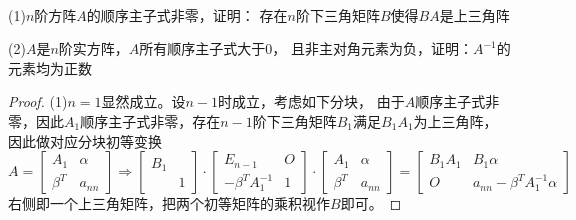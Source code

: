 ~

\begin{exercise}[分块矩阵与数学归纳法]
  (1)$n$阶方阵$A$的顺序主子式非零，证明：
  存在$n$阶下三角矩阵$B$使得$BA$是上三角阵

  (2)$A$是$n$阶实方阵，$A$所有顺序主子式大于$0$，
  且非主对角元素为负，证明：$A^{-1}$的元素均为正数
\end{exercise}

\begin{proof}
  (1)$n=1$显然成立。设$n-1$时成立，考虑如下分块，
  由于$A$顺序主子式非零，因此$A_1$顺序主子式非零，存在$n-1$阶下三角矩阵$B_1$满足$B_1A_1$为上三角阵，
  因此做对应分块初等变换
  \begin{equation*}
    A = \left[
      \begin{array}{cc}
        A_1&\alpha \\
        \beta^T&a_{nn}
      \end{array}
    \right] \Rightarrow \left[
      \begin{array}{cc}
        B_1& \\
           &1
      \end{array}
    \right] \cdot \left[
      \begin{array}{cc}
        E_{n-1}&O\\
        -\beta^T A_1^{-1}&1
      \end{array}
    \right] \cdot \left[
      \begin{array}{cc}
        A_1&\alpha\\
        \beta^T&a_{nn}
      \end{array}
    \right] = \left[
      \begin{array}{cc}
        B_1A_1&B_1\alpha\\
        O&a_{nn} - \beta^T A^{-1}_1\alpha
      \end{array}
    \right]
  \end{equation*}
  右侧即一个上三角矩阵，把两个初等矩阵的乘积视作$B$即可。


\end{proof}
